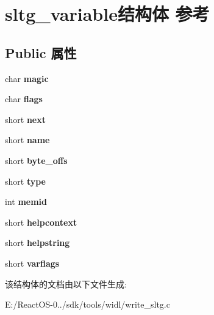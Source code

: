 \hypertarget{structsltg__variable}{}\section{sltg\+\_\+variable结构体 参考}
\label{structsltg__variable}
\subsection*{Public 属性}
\begin{DoxyCompactItemize}
\item 
\mbox{\label{structsltg__variable_a740aa4d6467c6dcc9e19c0259b5aa8f6}} 
char {\bfseries magic}
\item 
\mbox{\label{structsltg__variable_aaf37237ec64f551ea9909de9ce3550c2}} 
char {\bfseries flags}
\item 
\mbox{\label{structsltg__variable_a26329e5ff6dfadd41b8fd029a67b401f}} 
short {\bfseries next}
\item 
\mbox{\label{structsltg__variable_ada2041c28021ea9b1560bc3fe6725f3e}} 
short {\bfseries name}
\item 
\mbox{\label{structsltg__variable_a269fe39a3fd5a748b4301142ac179608}} 
short {\bfseries byte\+\_\+offs}
\item 
\mbox{\label{structsltg__variable_a0b0f8b251f7bf60826e923d981b982bd}} 
short {\bfseries type}
\item 
\mbox{\label{structsltg__variable_a253977f76452cf193bc21f7d163bf09e}} 
int {\bfseries memid}
\item 
\mbox{\label{structsltg__variable_ac57cbcf8845f3e85d0e27eaee925d473}} 
short {\bfseries helpcontext}
\item 
\mbox{\label{structsltg__variable_ab694a1f630f104340535d3e5234eda30}} 
short {\bfseries helpstring}
\item 
\mbox{\label{structsltg__variable_a48597efae4a466d849fe83656cc03df3}} 
short {\bfseries varflags}
\end{DoxyCompactItemize}


该结构体的文档由以下文件生成\+:\begin{DoxyCompactItemize}
\item 
E\+:/\+React\+O\+S-\/0../sdk/tools/widl/write\+\_\+sltg.\+c\end{DoxyCompactItemize}
